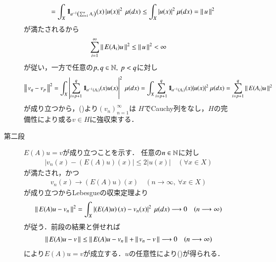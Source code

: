 \begin{prf}
\begin{description}
\begin{description}
\begin{align}
							&\qquad = \int_X \mbox{1}\hspace{-0.25em}\mbox{l}_{a^{-1}\left( \sum_{i=1}^{n}A_i \right)}(x) \left| u(x) \right|^2\ \mu(dx)
							\leq \int_X |u(x)|^2\ \mu(dx)
							= \left\|\, u\, \right\|_{}^2
						\end{align}
						が満たされるから
						\begin{align}
							\sum_{i=1}^{\infty} \left\|\, E(A_i) u\, \right\|_{}^2 \leq \left\|\, u\, \right\|_{}^2 < \infty
							\label{eq:report_9_2}
						\end{align}
						が従い，一方で任意の$p,q \in \mathbb{N},\ p < q$に対し
						\begin{align}
							\left\|\, v_q - v_p\, \right\|_{}^2
							= \int_X \left| \sum_{i=p+1}^{q} \mbox{1}\hspace{-0.25em}\mbox{l}_{a^{-1}(A_i)}(x) u(x) \right|^2\ \mu(dx)
							= \int_X \sum_{i=p+1}^{q} \mbox{1}\hspace{-0.25em}\mbox{l}_{a^{-1}(A_i)}(x) |u(x)|^2\ \mu(dx)
							= \sum_{i=p+1}^{q} \left\|\, E(A_i) u\, \right\|_{}^2
						\end{align}
						が成り立つから，()より$(v_n)_{n=1}^{\infty}$は
						$H$でCauchy列をなし，$H$の完備性により或る$v \in H$に強収束する．
					\item[第二段]
						$E(A)u = v$が成り立つことを示す．
						任意の$n \in \mathbb{N}$に対し
						\begin{align}
							\left| v_n(x) - \left( E(A)u \right)(x) \right| \leq 2|u(x)|
							\quad (\forall x \in X)
						\end{align}
						が満たされ，かつ
						\begin{align}
							v_n(x) \longrightarrow \left( E(A)u \right)(x)
							\quad (n \longrightarrow \infty,\ \forall x \in X)
						\end{align}
						が成り立つからLebesgueの収束定理より
						\begin{align}
							\left\|\, E(A)u - v_n\, \right\|_{}^2
							= \int_X \left| \left( E(A)u \right)(x) - v_n(x) \right|^2\ \mu(dx)
							\longrightarrow 0 \quad (n \longrightarrow \infty)
						\end{align}
						が従う．前段の結果と併せれば
						\begin{align}
							\left\|\, E(A)u - v\, \right\|_{}
							\leq \left\|\, E(A)u - v_n\, \right\|_{} + \left\|\, v_n - v\, \right\|_{}
							\longrightarrow 0 \quad (n \longrightarrow \infty)
						\end{align}
						により$E(A)u = v$が成立する．$u$の任意性により()が得られる．
				\end{description}
				

\end{description}
\end{prf}
